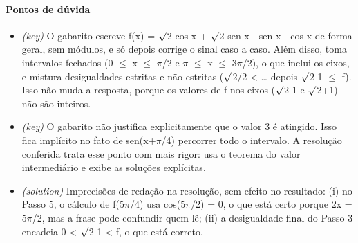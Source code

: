 \documentclass{article}%
\begin{document}
\paragraph{Pontos de dúvida}%
\begin{itemize}%
\item%
\textit{(key)} O gabarito escreve f(x) = $\surd$2 cos x + $\surd$2 sen x - sen x - cos x de forma geral, sem módulos, e só depois corrige o sinal caso a caso. Além disso, toma intervalos fechados (0 $\leq$ x $\leq$ $\pi$/2 e $\pi$ $\leq$ x $\leq$ 3$\pi$/2), o que inclui os eixos, e mistura desigualdades estritas e não estritas ($\surd$2/2 < \ldots{} depois $\surd$2-1 $\leq$ f). Isso não muda a resposta, porque os valores de f nos eixos ($\surd$2-1 e $\surd$2+1) não são inteiros.%
\item%
\textit{(key)} O gabarito não justifica explicitamente que o valor 3 é atingido. Isso fica implícito no fato de sen(x+$\pi$/4) percorrer todo o intervalo. A resolução conferida trata esse ponto com mais rigor: usa o teorema do valor intermediário e exibe as soluções explícitas.%
\item%
\textit{(solution)} Imprecisões de redação na resolução, sem efeito no resultado: (i) no Passo 5, o cálculo de f(5$\pi$/4) usa cos(5$\pi$/2) = 0, o que está certo porque 2x = 5$\pi$/2, mas a frase pode confundir quem lê; (ii) a desigualdade final do Passo 3 encadeia 0 < $\surd$2-1 < f, o que está correto.%
\end{itemize}%
\end{document}
